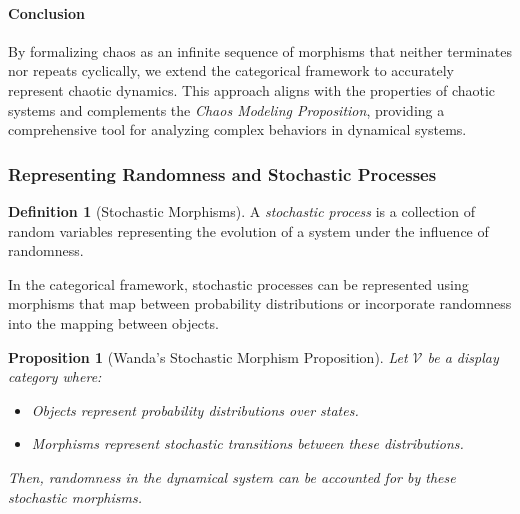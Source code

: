 \documentclass{article}
\newtheorem{proposition}{Proposition}[section]
\theoremstyle{definition}
\newtheorem{definition}{Definition}[section]
\theoremstyle{remark}
\begin{document}
	\paragraph{Conclusion}
	
	By formalizing chaos as an infinite sequence of morphisms that neither terminates nor repeats cyclically, we extend the categorical framework to accurately represent chaotic dynamics. This approach aligns with the properties of chaotic systems and complements the \emph{Chaos Modeling Proposition}, providing a comprehensive tool for analyzing complex behaviors in dynamical systems.
	
	
	
	
	
	\subsubsection{Representing Randomness and Stochastic Processes}
	
	\begin{definition}[Stochastic Morphisms]
		A \emph{stochastic process} is a collection of random variables representing the evolution of a system under the influence of randomness.
		
		In the categorical framework, stochastic processes can be represented using morphisms that map between probability distributions or incorporate randomness into the mapping between objects.
	\end{definition}
	
	\begin{proposition}[Wanda's Stochastic Morphism Proposition]
		Let $\mathcal{V}$ be a display category where:
		\begin{itemize}
			\item Objects represent probability distributions over states.
			\item Morphisms represent stochastic transitions between these distributions.
		\end{itemize}
		Then, randomness in the dynamical system can be accounted for by these stochastic morphisms.
	\end{proposition}
	
\end{document}
